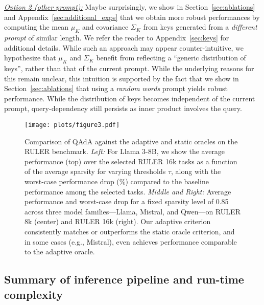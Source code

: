 \underline{\textit{Option 2 (other prompt):}} Maybe surprisingly, we show in Section~\ref{sec:ablations}  and Appendix~\ref{sec:additional_exps} that we obtain more robust performances by computing the mean $\mu_K$ and covariance $\Sigma_K$ from keys generated from a \textit{different prompt} of similar length. We refer the reader to Appendix~\ref{sec:keys} for additional details. While such an approach may appear counter-intuitive, we hypothesize that $\mu_K$ and $\Sigma_K$ benefit from reflecting a ``generic distribution of keys'', rather than that of the current prompt. While the underlying reasons for this remain unclear, this intuition is supported by the fact that we show in Section~\ref{sec:ablations} that using a \textit{random words} prompt yields robust performance.  While the distribution of keys becomes independent of the current prompt, query-dependency still persists as inner product involves the query.























\begin{figure*}[t]
\centering
\texttt{[image: plots/figure3.pdf]}
    \caption{\small Comparison of QAdA against the adaptive and static oracles on the RULER benchmark.  
\textit{Left:} For Llama 3-8B, we show the average performance (top) over the selected RULER 16k tasks as a function of the average sparsity for varying thresholds $\tau$, along with the worst-case performance drop (\%) compared to the baseline performance among the selected tasks.  
\textit{Middle and Right:} Average performance and worst-case drop for a fixed sparsity level of 0.85 across three model families—Llama, Mistral, and Qwen—on RULER 8k (center) and RULER 16k (right).  
Our adaptive criterion consistently matches or outperforms the static oracle criterion, and in some cases (e.g., Mistral), even achieves performance comparable to the adaptive oracle.}
    \label{fig:compare-approx}
\end{figure*}



\subsection{Summary of inference pipeline and run-time complexity}
\label{sec:pipeline}

